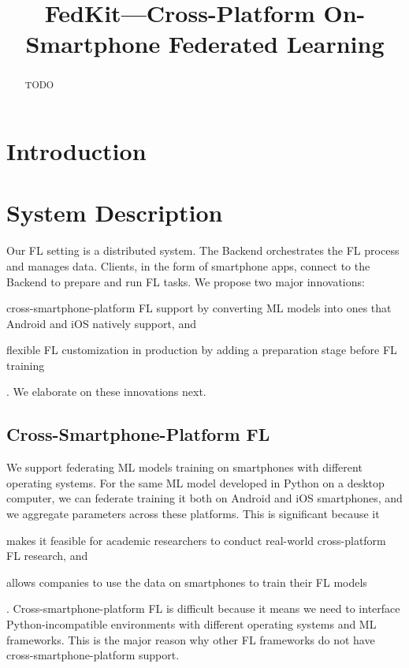 \documentclass[letterpaper]{article} %
\title{FedKit---Cross-Platform On-Smartphone Federated Learning}
\author{}
\begin{document}
\maketitle

\begin{abstract}
    TODO
\end{abstract}

\section{Introduction}


\section{System Description}

Our FL setting is a distributed system.
The Backend orchestrates the FL process and manages data.
Clients, in the form of smartphone apps,
connect to the Backend to prepare and run FL tasks.
We propose two major innovations:
\begin{enumerate*}[label=\arabic*)]
    \item cross-smartphone-platform FL support by converting ML models
    into ones that Android and iOS natively support, and
    \item flexible FL customization in production by adding a preparation stage
    before FL training
\end{enumerate*}.
We elaborate on these innovations next.

\subsection{Cross-Smartphone-Platform FL}
We support federating ML models training on smartphones
with different operating systems.
For the same ML model developed in Python on a desktop computer,
we can federate training it both on Android and iOS smartphones,
and we aggregate parameters across these platforms.
This is significant because it
\begin{enumerate*}[label=\arabic*)]
    \item makes it feasible for academic researchers to
        conduct real-world cross-platform FL research, and
    \item allows companies to use the data on smartphones to train their FL
        models
\end{enumerate*}.
Cross-smartphone-platform FL is difficult because it means we need to interface
Python-incompatible environments with different operating systems and
ML frameworks.
This is the major reason why other FL frameworks do not have
cross-smartphone-platform support.
\end{document}
